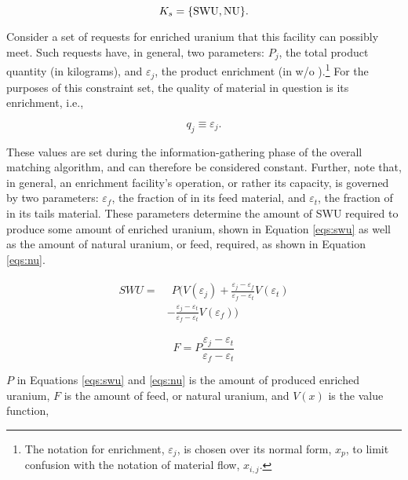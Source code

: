 \begin{equation}\label{eqs:enr-constr-commods}
  K_{s} = \{ \text{\text{SWU}}, \text{\text{NU}} \}.
\end{equation}


Consider a set of requests for enriched uranium that this facility can possibly
meet. Such requests have, in general, two parameters: $P_{j}$, the total product
quantity (in kilograms), and $\varepsilon_{j}$, the product enrichment (in w/o
).\footnote{The notation for enrichment, $\varepsilon_{j}$, is
  chosen over its normal form, $x_p$, to limit confusion with the notation of
  material flow, $x_{i,j}$.}  For the purposes of this constraint set, the
quality of material in question is its enrichment, i.e.,

\begin{equation}\label{eqs:enr-q-swu}
  q_{j} \equiv \varepsilon_{j}.
\end{equation}

These values are set during the information-gathering phase of the overall
matching algorithm, and can therefore be considered constant. Further, note
that, in general, an enrichment facility's operation, or rather its capacity, is
governed by two parameters: $\varepsilon_{f}$, the fraction of  in
its feed material, and $\varepsilon_{t}$, the fraction of  in its
tails material. These parameters determine the amount of SWU required to produce
some amount of enriched uranium, shown in Equation \ref{eqs:swu} as well as the
amount of natural uranium, or feed, required, as shown in Equation \ref{eqs:nu}.

\begin{align}
\begin{split}
\label{eqs:swu}
SWU = & \:\: P ( V(\varepsilon_{j}) 
      + \frac{\varepsilon_{j} - \varepsilon_{f}}
               {\varepsilon_{f} - \varepsilon_{t}} V(\varepsilon_{t}) \\
      & - \frac{\varepsilon_{j} - \varepsilon_{t}}
               {\varepsilon_{f} - \varepsilon_{t}} V(\varepsilon_{f}) )
\end{split}
\end{align}

\begin{equation}
\label{eqs:nu}
F = P \frac{\varepsilon_{j} - \varepsilon_{t}}
           {\varepsilon_{f} - \varepsilon_{t}}
\end{equation}

\noindent
$P$ in Equations \ref{eqs:swu} and \ref{eqs:nu} is the amount of produced
enriched uranium, $F$ is the amount of feed, or natural uranium, and $V(x)$ is
the value function,

